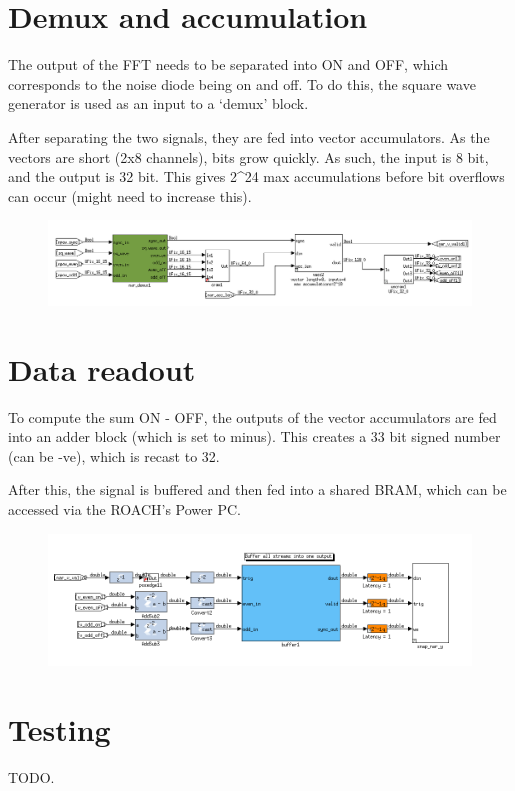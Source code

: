 \documentclass[letterpaper,10pt,english]{sphinxmanual}
\begin{document}
\section{Demux and accumulation}
\label{noise_diode:demux-and-accumulation}
The output of the FFT needs to be separated into ON and OFF, which corresponds to the
noise diode being on and off. To do this, the square wave generator is used as an input
to a `demux' block.

After separating the two signals, they are fed into vector accumulators. As the vectors are
short (2x8 channels), bits grow quickly. As such, the input is 8 bit, and the output is 32 bit.
This gives 2\textasciicircum{}24 max accumulations before bit overflows can occur (might need to increase this).
\begin{figure}[htbp]
\centering

\includegraphics{demux_vacc.png}
\end{figure}


\section{Data readout}
\label{noise_diode:data-readout}
To compute the sum ON - OFF, the outputs of the vector accumulators are fed into an adder block
(which is set to minus). This creates a 33 bit signed number (can be -ve), which is recast to 32.

After this, the signal is buffered and then fed into a shared BRAM, which can be accessed via the
ROACH's Power PC.
\begin{figure}[htbp]
\centering

\includegraphics{buffer_snap.png}
\end{figure}


\section{Testing}
\label{noise_diode:testing}
TODO.
\end{document}

